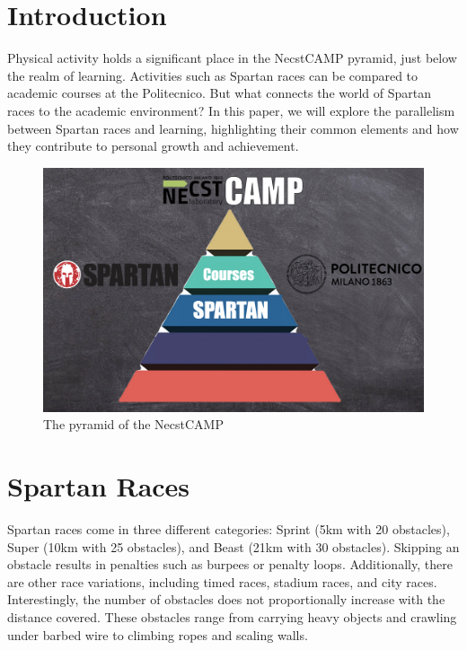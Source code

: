 \documentclass[12pt,oneside,a4paper]{article}
\begin{document}
\section{Introduction} \label{sec:intro}
Physical activity holds a significant place in the NecstCAMP pyramid, just below the realm of learning. Activities such as Spartan races can be compared to academic courses at the Politecnico. But what connects the world of Spartan races to the academic environment? In this paper, we will explore the parallelism between Spartan races and learning, highlighting their common elements and how they contribute to personal growth and achievement.
\begin{figure}[h]
    \centering
    \includegraphics[width=.7\textwidth]{piramide.png}
    \caption{The pyramid of the NecstCAMP}
    \label{fig:my_label}
\end{figure}

\section{Spartan Races} \label{sec:spraces}
Spartan races come in three different categories: Sprint (5km with 20 obstacles), Super (10km with 25 obstacles), and Beast (21km with 30 obstacles). Skipping an obstacle results in penalties such as burpees or penalty loops. Additionally, there are other race variations, including timed races, stadium races, and city races. Interestingly, the number of obstacles does not proportionally increase with the distance covered. These obstacles range from carrying heavy objects and crawling under barbed wire to climbing ropes and scaling walls.
\end{document}

